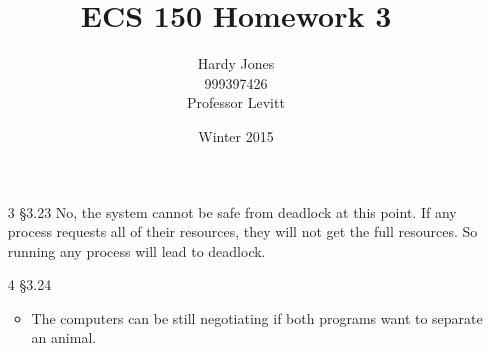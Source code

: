 \documentclass[12pt,letterpaper]{article}
\title{ECS 150 Homework 3\vspace{-2ex}}
\author{Hardy Jones\\
        999397426\\
        Professor Levitt\vspace{-2ex}}
\date{Winter 2015}
\begin{document}
  \maketitle

  \begin{enumerate}
    \item [3 \S 3.23]
      No, the system cannot be safe from deadlock at this point.
      If any process requests all of their resources,
      they will not get the full resources.
      So running any process will lead to deadlock.

    \item [4 \S 3.24]
      \begin{itemize}
        \item
          The computers can be still negotiating if both programs want to separate an animal.


\end{itemize}
\end{enumerate}
\end{document}
